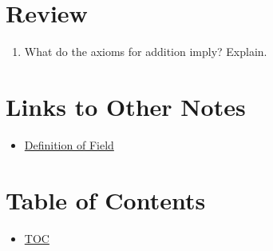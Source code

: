 \section*{Review}
\begin{enumerate}
  \item What do the axioms for addition imply? Explain.
\end{enumerate}


\section*{Links to Other Notes}
\begin{itemize}
  \item \hyperref[202501150657]{Definition of Field}
\end{itemize}

\section*{Table of Contents}

\begin{itemize}
  \item \hyperref[toc]{TOC}
\end{itemize}

